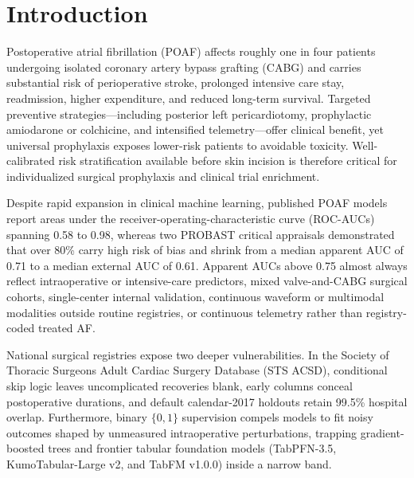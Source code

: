 \section{Introduction}
\label{sec:intro}

Postoperative atrial fibrillation (POAF) affects roughly one in four patients undergoing isolated coronary artery bypass grafting (CABG) and carries substantial risk of perioperative stroke, prolonged intensive care stay, readmission, higher expenditure, and reduced long-term survival.\cite{aranki1996predictors,villareal2004,dobrev2019postoperative,caldonazo2023meta,gaudino2023ehj} Targeted preventive strategies---including posterior left pericardiotomy,\cite{gaudino2021palacs} prophylactic amiodarone or colchicine, and intensified telemetry\cite{chatterjee2026sts}---offer clinical benefit, yet universal prophylaxis exposes lower-risk patients to avoidable toxicity. Well-calibrated risk stratification available before skin incision is therefore critical for individualized surgical prophylaxis and clinical trial enrichment.

Despite rapid expansion in clinical machine learning, published POAF models report areas under the receiver-operating-characteristic curve (ROC-AUCs) spanning 0.58 to 0.98, whereas two PROBAST critical appraisals demonstrated that over 80\% carry high risk of bias and shrink from a median apparent AUC of 0.71 to a median external AUC of 0.61.\cite{fields2025poaf,lopeztuesta2026poaf} Apparent AUCs above 0.75 almost always reflect intraoperative or intensive-care predictors,\cite{mathew2004multicenter,magee2007atrial,ma2025noaf,cao2025mimic4} mixed valve-and-CABG surgical cohorts,\cite{mariscalco2014poaf,burgos2021comaf} single-center internal validation,\cite{cho2026poaf} continuous waveform or multimodal modalities outside routine registries,\cite{han2025aiecg,khalpey2026digital} or continuous telemetry rather than registry-coded treated AF.\cite{filardo2017telemetry,perezgrovas2023jaha}

National surgical registries expose two deeper vulnerabilities. In the Society of Thoracic Surgeons Adult Cardiac Surgery Database (STS ACSD),\cite{sts2014v281,shahian2018sts,obrien2018sts2} conditional skip logic leaves uncomplicated recoveries blank, early columns conceal postoperative durations, and default calendar-2017 holdouts retain 99.5\% hospital overlap. Furthermore, binary $\{0,1\}$ supervision compels models to fit noisy outcomes shaped by unmeasured intraoperative perturbations,\cite{echahidi2008mechanisms,dobrev2019postoperative} trapping gradient-boosted trees and frontier tabular foundation models (TabPFN-3.5,\cite{hollmann2025tabpfn,jaeger2026tabpfn35} KumoTabular-Large v2,\cite{qu2026kumotabular} and TabFM v1.0.0\cite{kong2026tabfm}) inside a narrow band.

